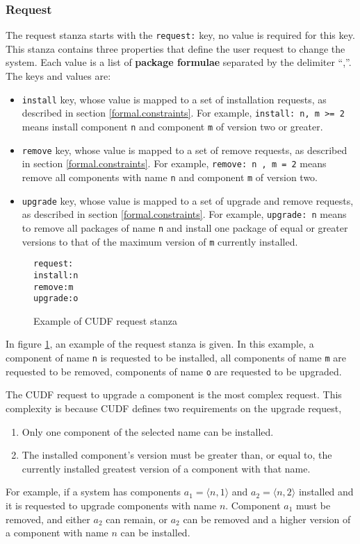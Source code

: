 \subsubsection{Request}
\label{formal.cudfdes.request}
The request stanza starts with the \verb+request:+ key, no value is required for this key.
This stanza contains three properties that define the user request to change the system.
Each value is a list of \textbf{package formulae} separated by the delimiter ``,''.
The keys and values are:
\begin{itemize}
  \item \verb+install+ key, whose value is mapped to a set of installation requests, as described in section \ref{formal.constraints}.
  For example, \verb+install: n, m >= 2+ means install component \verb+n+ and component \verb+m+ of version two or greater.
  \item \verb+remove+ key, whose value is mapped to a set of remove requests, as described in section \ref{formal.constraints}.
  For example, \verb+remove: n , m = 2+ means remove all components with name \verb+n+ and component \verb+m+ of version two.
  \item \verb+upgrade+ key, whose value is mapped to a set of upgrade and remove requests, as described in section \ref{formal.constraints}.
  For example, \verb+upgrade: n+ means to remove all packages of name \verb+n+ and install one package of equal or greater versions to that of the maximum version of \verb+m+ currently installed. 
\end{itemize}

\begin{figure}[htp] 
\begin{center}
\begin{alltt}
request:
install: n
remove: m
upgrade: o
\end{alltt}
  \caption{Example of CUDF request stanza}
  \label{formal.cudfrequeststanza}
\end{center}
\end{figure}

In figure \ref{formal.cudfrequeststanza}, an example of the request stanza is given.
In this example, a component of name \verb+n+ is requested to be installed, all components of name \verb+m+ are requested to be removed,
components of name \verb+o+ are requested to be upgraded.

The CUDF request to upgrade a component is the most complex request.
This complexity is because CUDF defines two requirements on the upgrade request,
\begin{enumerate}
  \item Only one component of the selected name can be installed.
  \item The installed component's version must be greater than, or equal to, the currently installed greatest version of a component with that name.
\end{enumerate}
For example, if a system has components $a_1 = \langle n,1 \rangle$ and $a_2 = \langle n,2 \rangle$ installed and it is requested to upgrade components with name $n$.
Component $a_1$ must be removed, and either $a_2$ can remain, or $a_2$ can be removed and a higher version of a component with name $n$ can be installed.

